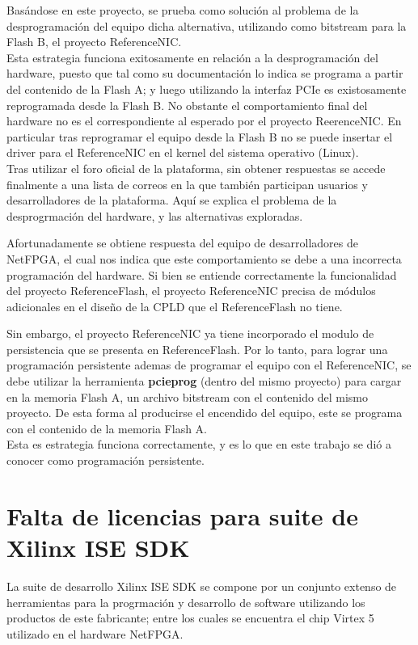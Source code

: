 Basándose en este proyecto, se prueba como solución al problema de la desprogramaci\'on del equipo dicha alternativa, utilizando como bitstream para la Flash B, el proyecto ReferenceNIC.\\

Esta estrategia funciona  exitosamente en relación a la desprogramaci\'on del hardware, puesto que tal como su documentación lo indica se programa a partir del contenido de la Flash A; y luego utilizando la interfaz PCIe es existosamente reprogramada desde la Flash B. No obstante el comportamiento final del hardware no es el correspondiente al esperado por el proyecto ReerenceNIC. En particular tras reprogramar el equipo desde la Flash B no se puede insertar el driver para el ReferenceNIC en el kernel del sistema operativo (Linux).\\

Tras utilizar el foro oficial de la plataforma, sin obtener respuestas se accede finalmente a una lista de correos en la que tambi\'en participan usuarios y desarrolladores de la plataforma. Aquí se explica el problema de la desprogrmaci\'on del hardware, y las alternativas exploradas. 

Afortunadamente se obtiene respuesta del equipo de desarrolladores de NetFPGA, el cual nos indica que este comportamiento se debe a una incorrecta programaci\'on del hardware. Si bien se entiende correctamente la funcionalidad del proyecto ReferenceFlash, el proyecto ReferenceNIC precisa de módulos adicionales en el diseño de la CPLD que el ReferenceFlash no tiene. 

Sin embargo, el proyecto ReferenceNIC ya tiene incorporado el modulo de persistencia que se presenta en ReferenceFlash. Por lo tanto, para lograr una programaci\'on persistente ademas de programar el equipo con el ReferenceNIC, se debe utilizar la herramienta \textbf{pcieprog} (dentro del mismo proyecto) para cargar en la memoria Flash A, un archivo bitstream con el contenido del mismo proyecto. De esta forma al producirse el encendido del equipo, este se programa con el contenido de la memoria Flash A.\\ 

Esta es estrategia funciona correctamente, y es lo que en este trabajo se di\'o a conocer como programación persistente.

\section{Falta de licencias para suite de Xilinx ISE SDK}
\label{apendiceB3}
La suite de desarrollo Xilinx ISE SDK se compone por un conjunto extenso de herramientas para la progrmaci\'on y desarrollo de software utilizando los productos de este fabricante; entre los cuales se encuentra el chip Virtex 5 utilizado en el hardware NetFPGA.\\

